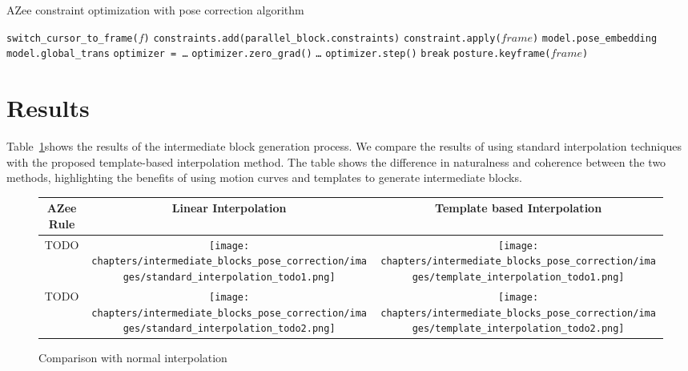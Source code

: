 \documentclass[../../main.tex]{subfiles}
\begin{document}
\begin{algorithm}
  \caption{AZee constraint optimization with pose correction algorithm}
  \label{alg:pose_correction}
  \begin{algorithmic}[1]
      \State \texttt{switch\_cursor\_to\_frame($f$)}
          \State \texttt{constraints.add(parallel\_block.constraints)}
      \EndFor
          \State \texttt{constraint.apply($frame$)}
      \EndFor
      \State \texttt{model.pose\_embedding}
      \State \texttt{model.global\_trans}
      \State \texttt{optimizer = \dots}
          \State \texttt{optimizer.zero\_grad()}
          \State \texttt{\dots}
          \State \texttt{optimizer.step()}
           \State \texttt{break} \EndIf
      \EndFor
      \State \texttt{posture.keyframe($frame$)}
  \EndFor
  \end{algorithmic}
  \end{algorithm}

\section{Results}
\label{ch:intermediate_blocks_pose_correction:results}

Table~\ref{tab:intermediate_blocks_comparison}shows the results of the intermediate block generation process. We compare the results of using standard interpolation techniques with the proposed template-based interpolation method. The table shows the difference in naturalness and coherence between the two methods, highlighting the benefits of using motion curves and templates to generate intermediate blocks.
\begin{figure}
    \centering
    \begin{tabular}{|c|c|c|}
    \hline
    \textbf{AZee Rule} & \textbf{Linear Interpolation} & \textbf{Template based Interpolation} \\
    \hline
    TODO & \texttt{[image: chapters/intermediate\_blocks\_pose\_correction/images/standard\_interpolation\_todo1.png]} & \texttt{[image: chapters/intermediate\_blocks\_pose\_correction/images/template\_interpolation\_todo1.png]} \\
    \hline
    TODO & \texttt{[image: chapters/intermediate\_blocks\_pose\_correction/images/standard\_interpolation\_todo2.png]} & \texttt{[image: chapters/intermediate\_blocks\_pose\_correction/images/template\_interpolation\_todo2.png]} \\
    \hline
    \end{tabular}
    \caption{Comparison with normal interpolation}
    \label{tab:intermediate_blocks_comparison}
\end{figure}
\end{document}
